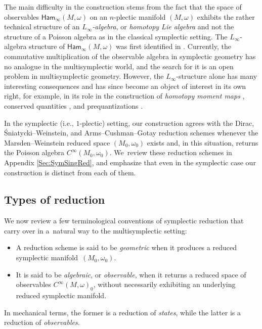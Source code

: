 \documentclass[pdftex]{sigma}
\numberwithin{equation}{section}
\newcommand{\Ham}{\mathsf{Ham}}
\begin{document}
The main difficulty in the construction stems from the fact that the space of observables $\Ham_\infty(M,\omega)$ on an $n$-plectic manifold $(M,\omega)$ exhibits the rather technical structure of an \emph{$L_\infty$-algebra}, or \emph{homotopy Lie algebra} and not the structure of a Poisson algebra as in the classical symplectic setting. The $L_\infty$-algebra structure of $\Ham_\infty(M,\omega)$ was first identified in \cite{Rogers10}. Currently, the commutative multiplication of the observable algebra in symplectic geometry has no analogue in the multisymplectic world, and the search for it is an open problem in multisymplectic geometry. However, the $L_\infty$-structure alone has many interesting consequences and has since become an object of interest in its own right, for example, in its role in the construction of \emph{homotopy moment maps} \cite{CalliesFregierRogersZambon16,FregierLaurent-GengouxZambon15,Herman18,ShabaziZambon16}, conserved quantities \cite{RyvkinWurzbacherZambon20}, and prequantizations \cite{FiorenzaRogersSchreiber14, SevestreWurzbacher21}.

In the symplectic (i.e., $1$-plectic) setting, our construction agrees with the Dirac, \'Sniatycki--Weinstein, and Arms--Cushman--Gotay reduction schemes whenever the Marsden--Weinstein reduced space $(M_0,\omega_0)$ exists and, in this situation, returns the Poisson algebra $C^\infty(M_0,\omega_0)$. We~review these reduction schemes in Appendix \ref{Sec:SymSingRed}, and emphasize that even in the symplectic case our construction is distinct from each of them.


\subsection*{Types of reduction}

We now review a few terminological conventions of symplectic reduction that carry over in a~natural way to the multisymplectic setting:
\begin{itemize}\itemsep=0pt
	\item A reduction scheme is said to be \emph{geometric} when it produces a reduced symplectic mani\-fold~$(M_0,\omega_0)$.
	\item It is said to be \emph{algebraic}, or \emph{observable}, when it returns a reduced space of observables $C^\infty(M,\omega)_0$, without necessarily exhibiting an underlying reduced symplectic manifold.
\end{itemize}
In mechanical terms, the former is a reduction of \emph{states}, while the latter is a reduction of \emph{observables}.
\end{document}
